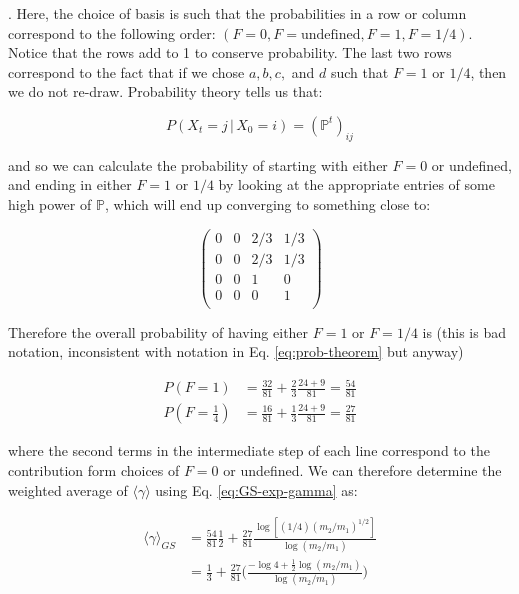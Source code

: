 \documentclass{article}
\begin{document}
\noindent. Here, the choice of basis is such that the probabilities in a row or column correspond to the following order: $(F=0,F=\text{undefined},F=1,F=1/4)$. Notice that the rows add to 1 to conserve probability. The last two rows correspond to the fact that if we chose $a,b,c,$ and $d$ such that $F=1 \text{ or } 1/4$, then we do not re-draw. Probability theory tells us that:

\begin{equation}
    \label{eq:prob-theorem}
    P(X_t=j \, |\,X_0=i) = (\mathbb{P}^t)_{ij}
\end{equation}

\noindent and so we can calculate the probability of starting with either $F=0$ or undefined, and ending in either $F=1 \text{ or } 1/4$ by looking at the appropriate entries of some high power of $\mathbb{P}$, which will end up converging to something close to:

\begin{equation}
        \begin{pmatrix}
        0 & 0 & 2/3 & 1/3 \\
        0 & 0 & 2/3 & 1/3 \\
        0 & 0 & 1 & 0 \\
        0 & 0 & 0 & 1 \\
    \end{pmatrix}
\end{equation}

\noindent Therefore the overall probability of having either $F=1$ or $F=1/4$ is (this is bad notation, inconsistent with notation in Eq. \eqref{eq:prob-theorem} but anyway)

\begin{align}
    P(F=1) & = \frac{32}{81}+ \frac{2}{3}\frac{24+9}{81} = \frac{54}{81}\\
    P(F=\frac{1}{4}) & = \frac{16}{81}+ \frac{1}{3}\frac{24+9}{81} = \frac{27}{81}
\end{align}

\noindent where the second terms in the intermediate step of each line correspond to the contribution form choices of $F=0$ or undefined. We can therefore determine the weighted average of $\langle \gamma\rangle$ using Eq. \eqref{eq:GS-exp-gamma} as:

\begin{align*}
    \langle \gamma\rangle_{GS} & = \frac{54}{81}\frac{1}{2} + \frac{27}{81}\frac{\log{[(1/4)(m_2/m_1)^{1/2}]}}{\log{(m_2/m_1)}} \\
    & = \frac{1}{3}+\frac{27}{81}\bigg( \frac{-\log{4} + \frac{1}{2}\log{(m_2/m_1)}}{\log{(m_2/m_1)}}\bigg)
\end{align*}
\end{document}
